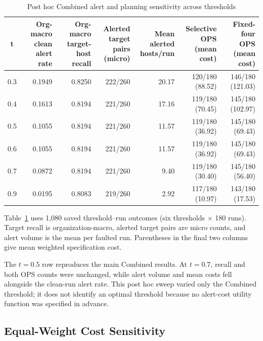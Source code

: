 \documentclass[sn-basic]{sn-jnl}%
\theoremstyle{thmstyleone}%
\theoremstyle{thmstyletwo}%
\theoremstyle{thmstylethree}%
\begin{document}
\begin{appendices}
\begin{table}
\centering
\caption{Post hoc Combined alert and planning sensitivity across thresholds}
\label{tab:app-d1}
\small
\setlength{\tabcolsep}{3pt}
\renewcommand{\arraystretch}{1.1}
\begin{tabular*}{\linewidth}{@{\extracolsep{\fill}}crrrrrr@{}}
\toprule
t & \shortstack{Org-macro\\clean alert rate} & \shortstack{Org-macro\\target-host recall} & \shortstack{Alerted target\\pairs (micro)} & \shortstack{Mean alerted\\hosts/run} & \shortstack{Selective OPS\\(mean cost)} & \shortstack{Fixed-four OPS\\(mean cost)} \\
\midrule
0.3 & 0.1949 & 0.8250 & 222/260 & 20.17 & 120/180 (88.52) & 146/180 (121.03) \\
0.4 & 0.1613 & 0.8194 & 221/260 & 17.16 & 119/180 (70.45) & 145/180 (102.97) \\
0.5 & 0.1055 & 0.8194 & 221/260 & 11.57 & 119/180 (36.92) & 145/180 (69.43) \\
0.6 & 0.1055 & 0.8194 & 221/260 & 11.57 & 119/180 (36.92) & 145/180 (69.43) \\
0.7 & 0.0872 & 0.8194 & 221/260 & 9.40 & 119/180 (30.40) & 145/180 (56.40) \\
0.9 & 0.0195 & 0.8083 & 219/260 & 2.92 & 117/180 (10.97) & 143/180 (17.53) \\
\bottomrule
\end{tabular*}
\end{table}

Table~\ref{tab:app-d1} uses 1,080 saved threshold--run outcomes (six thresholds \(\times\) 180 runs). Target recall is organization-macro, alerted target pairs are micro counts, and alert volume is the mean per faulted run. Parentheses in the final two columns give mean weighted specification cost.

The \(t=0.5\) row reproduces the main Combined results. At \(t=0.7\), recall and both OPS counts were unchanged, while alert volume and mean costs fell alongside the clean-run alert rate. This post hoc sweep varied only the Combined threshold; it does not identify an optimal threshold because no alert-cost utility function was specified in advance.

\subsection{Equal-Weight Cost Sensitivity}\label{app:d-2}


\end{appendices}
\end{document}
